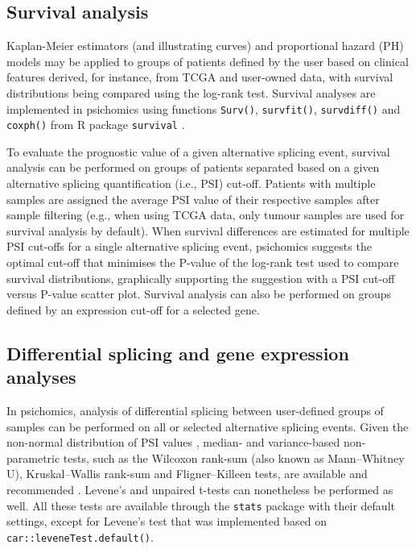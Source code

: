 \subsection{Survival analysis}

Kaplan-Meier estimators (and illustrating curves) \cite{rich:2010wt} and proportional hazard (PH) models \cite{spruance:2004vn} may be applied to groups of patients defined by the user based on clinical features derived, for instance, from TCGA and user-owned data, with survival distributions being compared using the log-rank test. Survival analyses are implemented in psichomics using functions \texttt{Surv()}, \texttt{survfit()}, \texttt{survdiff()} and \texttt{coxph()} from R package \texttt{survival} \cite{therneau:2000tk}.

To evaluate the prognostic value of a given alternative splicing event, survival analysis can be performed on groups of patients separated based on a given alternative splicing quantification (i.e., PSI) cut-off. Patients with multiple samples are assigned the average PSI value of their respective samples after sample filtering (e.g., when using TCGA data, only tumour samples are used for survival analysis by default). When survival differences are estimated for multiple PSI cut-offs for a single alternative splicing event, psichomics suggests the optimal cut-off that minimises the P-value of the log-rank test used to compare survival distributions, graphically supporting the suggestion with a PSI cut-off versus P-value scatter plot. Survival analysis can also be performed on groups defined by an expression cut-off for a selected gene.

\subsection{Differential splicing and gene expression analyses}

In psichomics, analysis of differential splicing between user-defined groups of samples can be performed on all or selected alternative splicing events. Given the non-normal distribution of PSI values \cite{kakaradov:2012wk,jia:2015wy}, median- and variance-based non-parametric tests, such as the Wilcoxon rank-sum (also known as Mann–Whitney U), Kruskal–Wallis rank-sum and Fligner–Killeen tests, are available and recommended \cite{caravela:2015vk}. Levene's and unpaired t-tests can nonetheless be performed as well. All these tests are available through the \texttt{stats} package with their default settings, except for Levene's test that was implemented based on \texttt{car::leveneTest.default()}.


